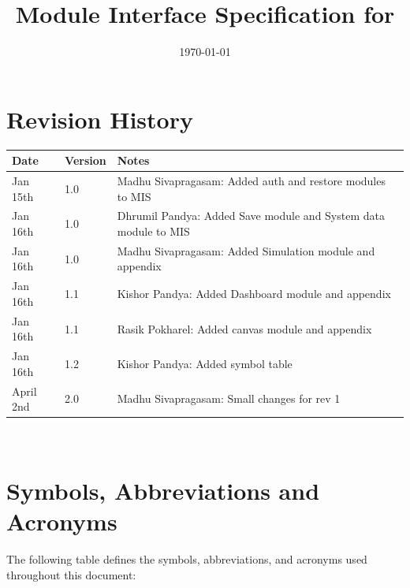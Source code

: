 \documentclass[12pt, titlepage]{article}
\begin{document}
\title{Module Interface Specification for \progname{}}

\author{\authname}

\date{\today}

\maketitle


\section{Revision History}

\begin{tabularx}{\textwidth}{p{3cm}p{2cm}X}
\toprule {\bf Date} & {\bf Version} & {\bf Notes}\\
\midrule
Jan 15th & 1.0 & Madhu Sivapragasam: Added auth and restore modules to MIS\\
Jan 16th & 1.0 & Dhrumil Pandya: Added Save module and System data module to MIS\\
Jan 16th & 1.0 & Madhu Sivapragasam: Added Simulation module and appendix\\
Jan 16th & 1.1 & Kishor Pandya: Added Dashboard module and appendix\\
Jan 16th & 1.1 & Rasik Pokharel: Added canvas module and appendix\\
Jan 16th & 1.2 & Kishor Pandya: Added symbol table\\
April 2nd & 2.0 & Madhu Sivapragasam: Small changes for rev 1\\
\bottomrule
\end{tabularx}

~\newpage

\section{Symbols, Abbreviations and Acronyms}
The following table defines the symbols, abbreviations, and acronyms used throughout this document:
\end{document}
